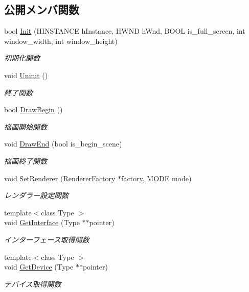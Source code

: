 \subsection*{公開メンバ関数}
\begin{DoxyCompactItemize}
\item 
bool \mbox{\hyperlink{class_renderer_a8d576add80187f5be3f24ec6a8108100}{Init}} (H\+I\+N\+S\+T\+A\+N\+CE h\+Instance, H\+W\+ND h\+Wnd, B\+O\+OL is\+\_\+full\+\_\+screen, int window\+\_\+width, int window\+\_\+height)
\begin{DoxyCompactList}\small\item\em 初期化関数 \end{DoxyCompactList}\item 
void \mbox{\hyperlink{class_renderer_ae865246d6a04d467ac22458f6f5f69d4}{Uninit}} ()
\begin{DoxyCompactList}\small\item\em 終了関数 \end{DoxyCompactList}\item 
bool \mbox{\hyperlink{class_renderer_af420951c9c163f1151bd6600df204cee}{Draw\+Begin}} ()
\begin{DoxyCompactList}\small\item\em 描画開始関数 \end{DoxyCompactList}\item 
void \mbox{\hyperlink{class_renderer_a0393849bd4178a33861780bf07b0deee}{Draw\+End}} (bool is\+\_\+begin\+\_\+scene)
\begin{DoxyCompactList}\small\item\em 描画終了関数 \end{DoxyCompactList}\item 
void \mbox{\hyperlink{class_renderer_a249147991a8187a3d373fd6bd43e8c54}{Set\+Renderer}} (\mbox{\hyperlink{class_renderer_factory}{Renderer\+Factory}} $\ast$factory, \mbox{\hyperlink{class_renderer_ab5a9379ccadcf2b3394c61cf8c835fec}{M\+O\+DE}} mode)
\begin{DoxyCompactList}\small\item\em レンダラー設定関数 \end{DoxyCompactList}\item 
{\footnotesize template$<$class Type $>$ }\\void \mbox{\hyperlink{class_renderer_a15585698849fcba4722ac0f00b8b62e6}{Get\+Interface}} (Type $\ast$$\ast$pointer)
\begin{DoxyCompactList}\small\item\em インターフェース取得関数 \end{DoxyCompactList}\item 
{\footnotesize template$<$class Type $>$ }\\void \mbox{\hyperlink{class_renderer_a6610c3a85a8170141c4584cecf4a6d15}{Get\+Device}} (Type $\ast$$\ast$pointer)
\begin{DoxyCompactList}\small\item\em デバイス取得関数 \end{DoxyCompactList}\end{DoxyCompactItemize}
